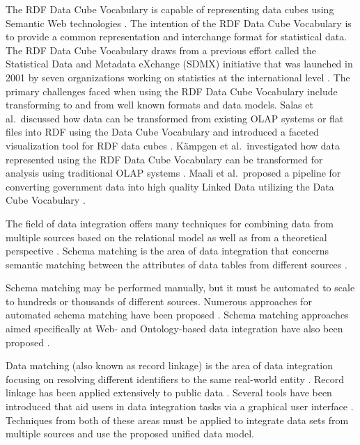 The RDF Data Cube Vocabulary is capable of representing data cubes using Semantic Web technologies \cite{rdfdatacube}. The intention of the RDF Data Cube Vocabulary is to provide a common representation and interchange format for statistical data. The RDF Data Cube Vocabulary draws from a previous effort called the Statistical Data and Metadata eXchange (SDMX) initiative that was launched in 2001 by seven organizations working on statistics at the international level \cite{cyganiak2010semantic}. The primary challenges faced when using the RDF Data Cube Vocabulary include transforming to and from well known formats and data models. Salas et al.\ discussed how data can be transformed from existing OLAP systems or flat files into RDF using the Data Cube Vocabulary and introduced a faceted visualization tool for RDF data cubes \cite{salas-icsc-2012}. K{\"a}mpgen et al.\ investigated how data represented using the RDF Data Cube Vocabulary can be transformed for analysis using traditional OLAP systems \cite{kampgen2011transforming}. Maali et al.\ proposed a pipeline for converting government data into high quality Linked Data utilizing the Data Cube Vocabulary \cite{maali2012publishing}.

The field of data integration offers many techniques for combining data from multiple sources based on the relational model \cite{doan2012principles} as well as from a theoretical perspective \cite{lenzerini2002data, halevy2006data, ziegler2004three}. Schema matching is the area of data integration that concerns semantic matching between the attributes of data tables from different sources \cite{rahm2001survey, fagin2003data}.

Schema matching may be performed manually, but it must be automated to scale to hundreds or thousands of different sources. Numerous approaches for automated schema matching have been proposed \cite{shvaiko2005survey, doan2001reconciling, kang2003schema, milo1998using, madhavan2001generic, doan2000learning}. Schema matching approaches aimed specifically at Web- and Ontology-based data integration have also been proposed \cite{he2003statistical, noy2004semantic, doan2005semantic, madhavan2007web, kalfoglou2003ontology, noy2009ontology, uschold2004ontologies, wache2001ontology, noy2003prompt, euzenat2007ontology}.

Data matching (also known as record linkage) is the area of data integration focusing on resolving different identifiers to the same real-world entity \cite{winkler1999state, winkler2006overview, koudas2006record, aizawa2005fast, gu2003record}. Record linkage has been applied extensively to public data \cite{jaro1995probabilistic, jaro1989advances, holman1999population}. Several tools have been introduced that aid users in data integration tasks via a graphical user interface \cite{christen2008febrl, kandel2011wrangler, elfeky2002tailor, gonzalez2010google}. Techniques from both of these areas must be applied to integrate data sets from multiple sources and use the proposed unified data model.

